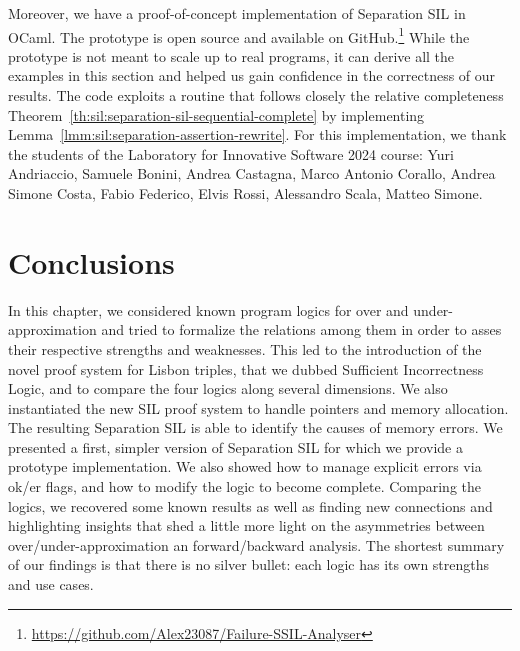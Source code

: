 Moreover, we have a proof-of-concept implementation of Separation SIL in OCaml. The prototype is open source and available on GitHub.\footnote{\url{https://github.com/Alex23087/Failure-SSIL-Analyser}} While the prototype is not meant to scale up to real programs, it can derive all the examples in this section and helped us gain confidence in the correctness of our results. The code exploits a routine that follows closely the relative completeness Theorem~\ref{th:sil:separation-sil-sequential-complete} by implementing Lemma~\ref{lmm:sil:separation-assertion-rewrite}.
For this implementation, we thank the students of the Laboratory for Innovative Software 2024 course: Yuri Andriaccio, Samuele Bonini, Andrea Castagna, Marco Antonio Corallo, Andrea Simone Costa, Fabio Federico, Elvis Rossi, Alessandro Scala, Matteo Simone.

\section{Conclusions}
In this chapter, we considered known program logics for over and under-approximation and tried to formalize the relations among them in order to asses their respective strengths and weaknesses. This led to the introduction of the novel proof system for Lisbon triples, that we dubbed Sufficient Incorrectness Logic, and to compare the four logics along several dimensions.
We also instantiated the new SIL proof system to handle pointers and memory allocation. The resulting Separation SIL is able to identify the causes of memory errors. We presented a first, simpler version of Separation SIL for which we provide a prototype implementation. We also showed how to manage explicit errors via ok/er flags, and how to modify the logic to become complete.
Comparing the logics, we recovered some known results as well as finding new connections and highlighting insights that shed a little more light on the asymmetries between over/under-approximation an forward/backward analysis. The shortest summary of our findings is that there is no silver bullet: each logic has its own strengths and use cases.
